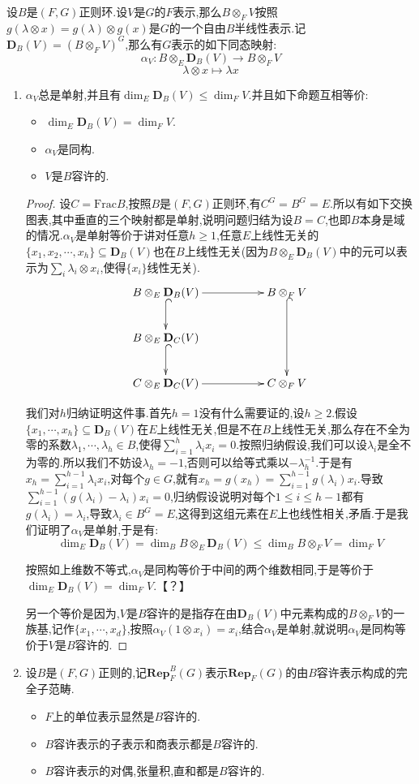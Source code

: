 设$B$是$(F,G)$正则环.设$V$是$G$的$F$表示,那么$B\otimes_FV$按照$g(\lambda\otimes x)=g(\lambda)\otimes g(x)$是$G$的一个自由$B$半线性表示.记$\textbf{D}_B(V)=(B\otimes_FV)^G$,那么有$G$表示的如下同态映射:
$$\alpha_V:B\otimes_E\textbf{D}_B(V)\to B\otimes_FV$$
$$\lambda\otimes x\mapsto\lambda x$$
\begin{enumerate}
	\item $\alpha_V$总是单射,并且有$\dim_E\textbf{D}_B(V)\le\dim_FV$.并且如下命题互相等价:
	\begin{itemize}
		\item $\dim_E\textbf{D}_B(V)=\dim_FV$.
		\item $\alpha_V$是同构.
		\item $V$是$B$容许的.
	\end{itemize}
	\begin{proof}
		
		设$C=\mathrm{Frac}B$,按照$B$是$(F,G)$正则环,有$C^G=B^G=E$.所以有如下交换图表,其中垂直的三个映射都是单射,说明问题归结为设$B=C$,也即$B$本身是域的情况.$\alpha_V$是单射等价于讲对任意$h\ge1$,任意$E$上线性无关的$\{x_1,x_2,\cdots,x_h\}\subseteq\textbf{D}_B(V)$也在$B$上线性无关(因为$B\otimes_E\textbf{D}_B(V)$中的元可以表示为$\sum_i\lambda_i\otimes x_i$,使得$\{x_i\}$线性无关).
		$$\xymatrix{B\otimes_E\textbf{D}_B(V)\ar[rr]\ar@{^{(}->}[d]&&B\otimes_FV\ar@{^{(}->}[dd]\\B\otimes_E\textbf{D}_C(V)\ar@{^{(}->}[d]&&\\C\otimes_E\textbf{D}_C(V)\ar[rr]&&C\otimes_FV}$$
		
		我们对$h$归纳证明这件事.首先$h=1$没有什么需要证的,设$h\ge2$.假设$\{x_1,\cdots,x_h\}\subseteq\textbf{D}_B(V)$在$E$上线性无关,但是不在$B$上线性无关,那么存在不全为零的系数$\lambda_1,\cdots,\lambda_h\in B$,使得$\sum_{i=1}^h\lambda_ix_i=0$.按照归纳假设,我们可以设$\lambda_i$是全不为零的.所以我们不妨设$\lambda_h=-1$,否则可以给等式乘以$-\lambda_h^{-1}$.于是有$x_h=\sum_{i=1}^{h-1}\lambda_ix_i$,对每个$g\in G$,就有$x_h=g(x_h)=\sum_{i=1}^{h-1}g(\lambda_i)x_i$.导致$\sum_{i=1}^{h-1}(g(\lambda_i)-\lambda_i)x_i=0$,归纳假设说明对每个$1\le i\le h-1$都有$g(\lambda_i)=\lambda_i$,导致$\lambda_i\in B^G=E$,这得到这组元素在$E$上也线性相关,矛盾.于是我们证明了$\alpha_V$是单射,于是有:
		$$\dim_E\textbf{D}_B(V)=\dim_BB\otimes_E\textbf{D}_B(V)\le\dim_BB\otimes_FV=\dim_FV$$
		
		按照如上维数不等式,$\alpha_V$是同构等价于中间的两个维数相同,于是等价于$\dim_E\textbf{D}_B(V)=\dim_FV$.【？】
		
		另一个等价是因为,$V$是$B$容许的是指存在由$\textbf{D}_B(V)$中元素构成的$B\otimes_FV$的一族基,记作$\{x_1,\cdots,x_d\}$,按照$\alpha_V(1\otimes x_i)=x_i$,结合$\alpha_V$是单射,就说明$\alpha_V$是同构等价于$V$是$B$容许的.
	\end{proof}
	\item 设$B$是$(F,G)$正则的,记$\textbf{Rep}_F^B(G)$表示$\textbf{Rep}_F(G)$的由$B$容许表示构成的完全子范畴.
	\begin{itemize}
		\item $F$上的单位表示显然是$B$容许的.
		\item $B$容许表示的子表示和商表示都是$B$容许的.
		\item $B$容许表示的对偶,张量积,直和都是$B$容许的.
	\end{itemize}
	

\end{enumerate}

